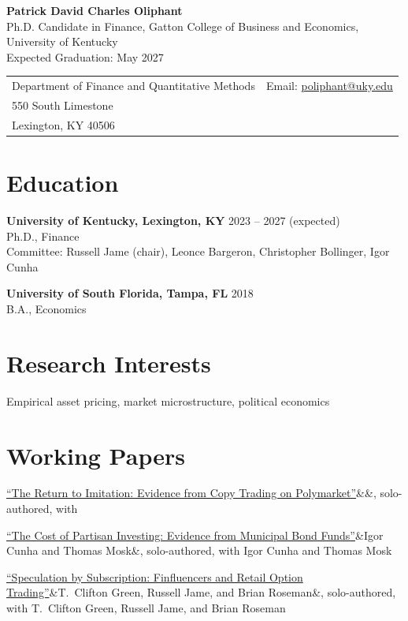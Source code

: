 \documentclass[11pt]{article}
\newcommand{\entry}[2]{\textbf{#1} \hfill #2\\}
\newcommand{\paper}[3]{\href{#1}{``#2''}\ifx&#3&, solo-authored\else, with #3\fi\par\smallskip}
\begin{document}
\begin{center}
{\LARGE\textbf{Patrick David Charles Oliphant}}\\[3pt]
Ph.D. Candidate in Finance, Gatton College of Business and Economics, University of Kentucky\\
Expected Graduation: May 2027
\end{center}
\vspace{2pt}
\begin{tabularx}{\textwidth}{@{}X r@{}}
Department of Finance and Quantitative Methods & Email: \href{mailto:poliphant@uky.edu}{poliphant@uky.edu} \\
550 South Limestone & \\
Lexington, KY 40506 & \\
\end{tabularx}

\section*{Education}
\entry{University of Kentucky, Lexington, KY}{2023 -- 2027 (expected)}
Ph.D., Finance\\
Committee: Russell Jame (chair), Leonce Bargeron, Christopher Bollinger, Igor Cunha

\medskip
\entry{University of South Florida, Tampa, FL}{2018}
B.A., Economics

\section*{Research Interests}
Empirical asset pricing, market microstructure, political economics

\section*{Working Papers}
\paper{https://papers.ssrn.com/sol3/papers.cfm?abstract_id=6670318}{The Return to Imitation: Evidence from Copy Trading on Polymarket}{}
\paper{https://papers.ssrn.com/sol3/papers.cfm?abstract_id=7693482}{The Cost of Partisan Investing: Evidence from Municipal Bond Funds}{Igor Cunha and Thomas Mosk}
\paper{https://papers.ssrn.com/sol3/papers.cfm?abstract_id=7123840}{Speculation by Subscription: Finfluencers and Retail Option Trading}{T.~Clifton Green, Russell Jame, and Brian Roseman}
\end{document}
